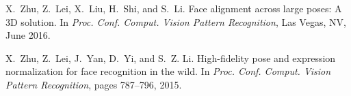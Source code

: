 \documentclass[a4paper, 10pt, conference]{ieeeconf}
\begin{document}
\begin{thebibliography}{10}
X.~Zhu, Z.~Lei, X.~Liu, H.~Shi, and S.~Li.
\newblock Face alignment across large poses: A {3D} solution.
\newblock In {\em Proc. Conf. Comput. Vision Pattern Recognition}, Las Vegas,
  NV, June 2016.

X.~Zhu, Z.~Lei, J.~Yan, D.~Yi, and S.~Z. Li.
\newblock High-fidelity pose and expression normalization for face recognition
  in the wild.
\newblock In {\em Proc. Conf. Comput. Vision Pattern Recognition}, pages
  787--796, 2015.

\end{thebibliography}
\end{document}
